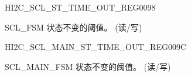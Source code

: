 \begin{register}{H}{I2C\_SCL\_ST\_TIME\_OUT\_REG}{\hexprefix{}0098}\label{regdesc:I2CSCLSTTIMEOUTREG}
%
%
\regnewline%
\begin{regdesc}\begin{reglist}
\label{fielddesc:I2CSCLSTTO}\item [I2C\_SCL\_ST\_TO] SCL\_FSM 状态不变的阈值。 (读/写)
\end{reglist}\end{regdesc}
\end{register}


\begin{register}{H}{I2C\_SCL\_MAIN\_ST\_TIME\_OUT\_REG}{\hexprefix{}009C}\label{regdesc:I2CSCLMAINSTTIMEOUTREG}
%
%
\regnewline%
\begin{regdesc}\begin{reglist}
\label{fielddesc:I2CSCLMAINSTTO}\item [I2C\_SCL\_MAIN\_ST\_TO] SCL\_MAIN\_FSM 状态不变的阈值。 (读/写)
\end{reglist}\end{regdesc}
\end{register}


